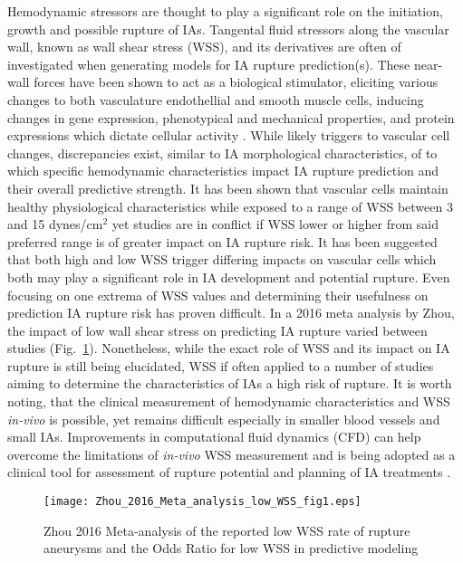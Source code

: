 Hemodynamic stressors are thought to play a significant role on the initiation, growth and possible rupture of IAs. Tangental fluid stressors along the vascular wall, known as wall shear stress (WSS), and its derivatives are often of investigated when generating models for IA rupture prediction(s)\cite{Jing2015,Xiang2011WSS,doddasomayajula2017hemodynamic,Cebral510}. These near-wall forces have been shown to act as a biological stimulator, eliciting various changes to both vasculature endothellial and smooth muscle cells, inducing changes in gene expression, phenotypical and mechanical properties, and protein expressions which dictate cellular activity \cite{baek2009flow,van2010analyzing,dolan2013high,sato2000local,baeyens2016endothelial,byrne2014quantifying,cecchi2011role,kulcsar2011hemodynamics}. While likely triggers to vascular cell changes, discrepancies exist, similar to IA morphological characteristics, of to which specific hemodynamic characteristics impact IA rupture prediction and their overall predictive strength. It has been shown that vascular cells maintain healthy physiological characteristics while exposed to a range of WSS between 3 and 15 dynes/cm$^{2}$ yet studies are in conflict if WSS lower \cite{Miura519,boussel2008aneurysm} or higher \cite{dolan2013high,shojima2004magnitude} from said preferred range is of greater impact on IA rupture risk. It has been suggested that both high and low WSS trigger differing impacts on vascular cells \cite{Meng1254} which both may play a significant role in IA development and potential rupture. Even focusing on one extrema of WSS values and determining their usefulness on prediction IA rupture risk has proven difficult. In a 2016 meta analysis by Zhou, the impact of low wall shear stress on predicting IA rupture varied between studies (Fig.~\ref{Low_WSS_meta_analysis}). Nonetheless, while the exact role of WSS and its impact on IA rupture is still being elucidated, WSS if often applied to a number of studies aiming to determine the characteristics of IAs a high risk of rupture. It is worth noting, that the clinical measurement of hemodynamic characteristics and WSS \textit{in-vivo} is possible, yet remains difficult especially in smaller blood vessels and small IAs. Improvements in computational fluid dynamics (CFD) can help overcome the limitations of \textit{in-vivo} WSS measurement and is being adopted as a clinical tool for assessment of rupture potential and planning of IA treatments \cite{steinman2002image,valen2013mind}. 

\begin{figure}[!h]
\begin{center}
\texttt{[image: Zhou\_2016\_Meta\_analysis\_low\_WSS\_fig1.eps]}
\captionsetup{width=0.5\textwidth, justification=justified,singlelinecheck=false}
\caption{Zhou 2016 Meta-analysis of the reported low WSS rate of rupture aneurysms and the Odds Ratio for low WSS in predictive modeling}
\end{center}
\label{Low_WSS_meta_analysis}
\end{figure}


